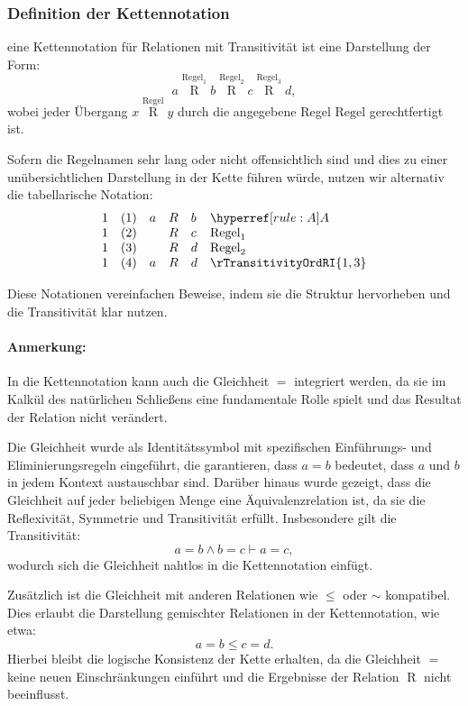 \documentclass[main.tex]{subfiles}
\begin{document}
\subsubsection*{Definition der Kettennotation}

eine Kettennotation für Relationen mit Transitivität ist eine Darstellung der Form:
\[
a \stackrel{\text{Regel}_1}{\mathrel{R}} b \stackrel{\text{Regel}_2}{\mathrel{R}} c \stackrel{\text{Regel}_3}{\mathrel{R}} d,
\]
wobei jeder Übergang \(x \stackrel{\text{Regel}}{\mathrel{R}} y\) durch die angegebene Regel \(\text{Regel}\) gerechtfertigt ist.

Sofern die Regelnamen sehr lang oder nicht offensichtlich sind und dies zu einer unübersichtlichen Darstellung in der Kette führen würde, nutzen wir alternativ die tabellarische Notation:
\[
\begin{array}{llclll}
	1 & (1) & a & \mathrel{R} & b & \rA \\
	1 & (2) &   & \mathrel{R} & c & \text{Regel}_1 \\
	1 & (3) &   & \mathrel{R} & d & \text{Regel}_2 \\
        1 & (4) &  a & \mathrel{R} & d & \rTransitivityOrdRI{1,3} \\
\end{array}
\]

Diese Notationen vereinfachen Beweise, indem sie die Struktur hervorheben und die Transitivität klar nutzen.

\paragraph{Anmerkung:}  
In die Kettennotation kann auch die Gleichheit \(=\) integriert werden, da sie im Kalkül des natürlichen Schließens eine fundamentale Rolle spielt und das Resultat der Relation nicht verändert. 

Die Gleichheit wurde als Identitätssymbol mit spezifischen Einführungs- und Eliminierungsregeln eingeführt, die garantieren, dass \(a = b\) bedeutet, dass \(a\) und \(b\) in jedem Kontext austauschbar sind. Darüber hinaus wurde gezeigt, dass die Gleichheit auf jeder beliebigen Menge eine Äquivalenzrelation ist, da sie die Reflexivität, Symmetrie und Transitivität erfüllt. Insbesondere gilt die Transitivität:
\[
a = b \land b = c \vdash a = c,
\]
wodurch sich die Gleichheit nahtlos in die Kettennotation einfügt.

Zusätzlich ist die Gleichheit mit anderen Relationen wie \(\leq\) oder \(\sim\) kompatibel. Dies erlaubt die Darstellung gemischter Relationen in der Kettennotation, wie etwa:
\[
a = b \leq c = d.
\]
Hierbei bleibt die logische Konsistenz der Kette erhalten, da die Gleichheit \(=\) keine neuen Einschränkungen einführt und die Ergebnisse der Relation \(\mathrel{R}\) nicht beeinflusst.
\end{document}
